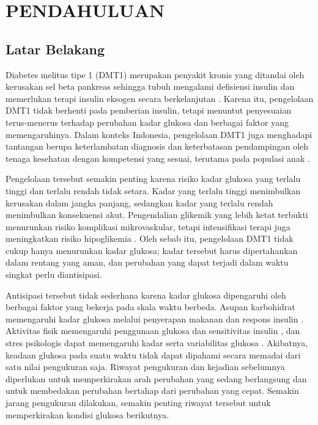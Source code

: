 \cleardoublepage
\chapter{PENDAHULUAN}
\label{chap:pendahuluan}


\section{Latar Belakang}
\label{sec:bab1-latar-belakang}

Diabetes melitus tipe 1 (DMT1) merupakan penyakit kronis yang ditandai oleh kerusakan sel beta pankreas sehingga tubuh mengalami defisiensi insulin dan memerlukan terapi 
insulin eksogen secara berkelanjutan \parencite{ada2026}. Karena itu, pengelolaan DMT1 tidak berhenti pada pemberian insulin, tetapi menuntut penyesuaian terus-menerus
terhadap perubahan kadar glukosa dan berbagai faktor yang memengaruhinya. Dalam konteks Indonesia, pengelolaan DMT1 juga menghadapi tantangan berupa keterlambatan diagnosis dan keterbatasan 
pendampingan oleh tenaga kesehatan dengan kompetensi yang sesuai, terutama pada populasi anak \parencite{pulungan2021,faizi2025}. 

Pengelolaan tersebut semakin penting karena risiko kadar glukosa yang terlalu tinggi dan terlalu rendah tidak setara. Kadar yang terlalu tinggi menimbulkan kerusakan dalam
jangka panjang, sedangkan kadar yang terlalu rendah menimbulkan konsekuensi akut. Pengendalian glikemik yang lebih ketat terbukti menurunkan risiko komplikasi mikrovaskular,
tetapi intensifikasi terapi juga meningkatkan risiko hipoglikemia \parencite{nathan2014}. Oleh sebab itu, pengelolaan DMT1 tidak cukup hanya menurunkan kadar glukosa; kadar
tersebut harus dipertahankan dalam rentang yang aman, dan perubahan yang dapat terjadi dalam waktu singkat perlu diantisipasi. 

Antisipasi tersebut tidak sederhana karena kadar glukosa dipengaruhi oleh berbagai faktor yang bekerja pada skala waktu berbeda. Asupan karbohidrat memengaruhi kadar
glukosa melalui penyerapan makanan dan respons insulin \parencite{bergman1979,dallaman2014}. Aktivitas fisik memengaruhi penggunaan glukosa dan sensitivitas insulin
\parencite{colberg2016}, dan stres psikologis dapat memengaruhi kadar serta variabilitas glukosa \parencite{velasco2022}. Akibatnya, keadaan glukosa pada suatu waktu tidak
dapat dipahami secara memadai dari satu nilai pengukuran saja. Riwayat pengukuran dan kejadian sebelumnya diperlukan untuk memperkirakan arah perubahan yang sedang
berlangsung dan untuk membedakan perubahan bertahap dari perubahan yang cepat. Semakin jarang pengukuran dilakukan, semakin penting riwayat tersebut untuk memperkirakan
kondisi glukosa berikutnya.

